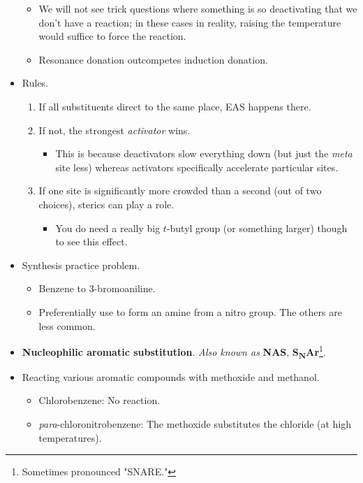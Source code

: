 \documentclass[../notes.tex]{subfiles}
\begin{document}
\begin{itemize}
\begin{itemize}
        \item We will not see trick questions where something is so deactivating that we don't have a reaction; in these cases in reality, raising the temperature would suffice to force the reaction.
        \item Resonance donation outcompetes induction donation.
    \end{itemize}
    \item Rules.
    \begin{enumerate}
        \item If all substituents direct to the same place, EAS happens there.
        \item If not, the strongest \emph{activator} wins.
        \begin{itemize}
            \item This is because deactivators slow everything down (but just the \emph{meta} site less) whereas activators specifically accelerate particular sites.
        \end{itemize}
        \item If one site is significantly more crowded than a second (out of two choices), sterics can play a role.
        \begin{itemize}
            \item You do need a really big $t$-butyl group (or something larger) though to see this effect.
        \end{itemize}
    \end{enumerate}
    \item Synthesis practice problem.
    \begin{itemize}
        \item Benzene to 3-bromoaniline.
        \item Preferentially use  to form an amine from a nitro group. The others are less common.
    \end{itemize}
    \item \textbf{Nucleophilic aromatic substitution}. \emph{Also known as} \textbf{NAS}, \textbf{S\textsubscript{N}Ar}\footnote{Sometimes pronounced "SNARE."}.
    \item Reacting various aromatic compounds with methoxide and methanol.
    \begin{itemize}
        \item Chlorobenzene: No reaction.
        \item \emph{para}-chloronitrobenzene: The methoxide substitutes the chloride (at high temperatures).

\end{itemize}
\end{itemize}
\end{document}
